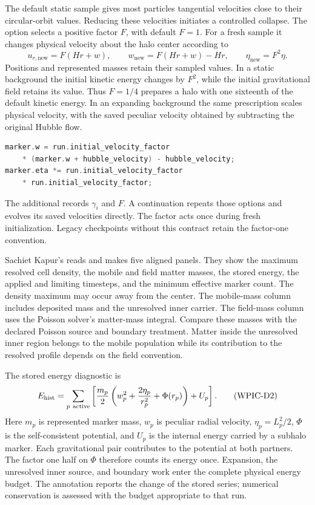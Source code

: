 The default static sample gives most particles tangential velocities close
to their circular-orbit values. Reducing these velocities initiates a
controlled collapse. The option  selects a positive
factor \(F\), with default \(F=1\). For a fresh sample it changes physical
velocity about the halo center according to
\[
 u_{r,\mathrm{new}}=F(Hr+w),\qquad
 w_{\mathrm{new}}=F(Hr+w)-Hr,\qquad
 \eta_{\mathrm{new}}=F^2\eta.                         \tag{WPIC-D1a}
\]
Positions and represented masses retain their sampled values. In a static
background the initial kinetic energy changes by \(F^2\), while the
initial gravitational field retains its value. Thus \(F=1/4\) prepares a
halo with one sixteenth of the default kinetic energy. In an expanding
background the same prescription scales physical velocity, with the saved
peculiar velocity obtained by subtracting the original Hubble flow.

\begin{lstlisting}[language=C++]
marker.w = run.initial_velocity_factor
    * (marker.w + hubble_velocity) - hubble_velocity;
marker.eta *= run.initial_velocity_factor
    * run.initial_velocity_factor;
\end{lstlisting}

The additional  records \(\gamma_i\)
and \(F\). A continuation repeats those options and evolves its saved
velocities directly. The factor acts once during fresh initialization.
Legacy checkpoints without this contract retain the factor-one convention.

Sachiet Kapur's  reads
 and makes five aligned panels. They show the maximum
resolved cell density, the mobile and field matter masses, the stored energy,
the applied and limiting timesteps, and the minimum effective marker count.
The density maximum may occur away from the center. The mobile-mass column
includes deposited mass and the unresolved inner carrier. The field-mass
column uses the Poisson solver's matter-mass integral. Compare these masses with the declared Poisson source and boundary
treatment. Matter inside the unresolved inner region belongs to the mobile
population while its contribution to the resolved profile depends on the
field convention.

The stored energy diagnostic is
\[
 E_{\rm hist}=\sum_{p\ {\rm active}}\left[
 \frac{m_p}{2}\left(w_p^2+\frac{2\eta_p}{r_p^2}
                              +\Phi(r_p)\right)+U_p\right]. \tag{WPIC-D2}
\]
Here \(m_p\) is represented marker mass, \(w_p\) is peculiar radial velocity,
\(\eta_p=L_p^2/2\), \(\Phi\) is the self-consistent potential, and \(U_p\)
is the internal energy carried by a subhalo marker. Each gravitational pair contributes to the potential at both partners.
The factor one half on \(\Phi\) therefore counts its energy once. Expansion, the unresolved inner source,
and boundary work enter the complete physical energy budget. The annotation
reports the change of the stored series; numerical conservation is assessed
with the budget appropriate to that run.

